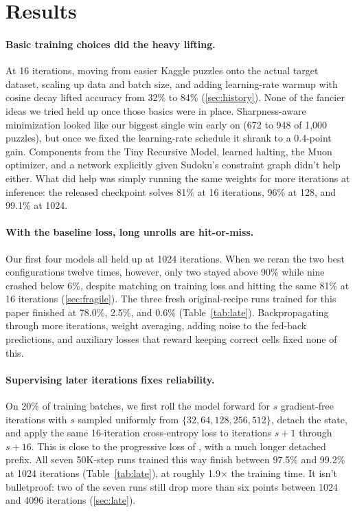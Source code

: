 \documentclass[10pt]{article}
\newcommand{\tabref}[1]{Table~\ref{#1}}
\begin{document}
\section{Results}

\paragraph{Basic training choices did the heavy lifting.} At 16 iterations, moving from easier Kaggle puzzles onto the actual target dataset, scaling up data and batch size, and adding learning-rate warmup with cosine decay lifted accuracy from 32\% to 84\% (\autoref{sec:history}). None of the fancier ideas we tried held up once those basics were in place. Sharpness-aware minimization \citep{foret2021sharpness} looked like our biggest single win early on (672 to 948 of 1,000 puzzles), but once we fixed the learning-rate schedule it shrank to a 0.4-point gain. Components from the Tiny Recursive Model, learned halting, the Muon optimizer, and a network explicitly given Sudoku's constraint graph didn't help either. What did help was simply running the same weights for more iterations at inference: the released checkpoint solves 81\% at 16 iterations, 96\% at 128, and 99.1\% at 1024.

\paragraph{With the baseline loss, long unrolls are hit-or-miss.} Our first four models all held up at 1024 iterations. When we reran the two best configurations twelve times, however, only two stayed above 90\% while nine crashed below 6\%, despite matching on training loss and hitting the same 81\% at 16 iterations (\autoref{sec:fragile}). The three fresh original-recipe runs trained for this paper finished at 78.0\%, 2.5\%, and 0.6\% (\tabref{tab:late}). Backpropagating through more iterations, weight averaging, adding noise to the fed-back predictions, and auxiliary losses that reward keeping correct cells fixed none of this.

\paragraph{Supervising later iterations fixes reliability.} On 20\% of training batches, we first roll the model forward for $s$ gradient-free iterations with $s$ sampled uniformly from $\{32, 64, 128, 256, 512\}$, detach the state, and apply the same 16-iteration cross-entropy loss to iterations $s{+}1$ through $s{+}16$. This is close to the progressive loss of \citet{bansal2022end}, with a much longer detached prefix. All seven 50K-step runs trained this way finish between 97.5\% and 99.2\% at 1024 iterations (\tabref{tab:late}), at roughly 1.9$\times$ the training time. It isn't bulletproof: two of the seven runs still drop more than six points between 1024 and 4096 iterations (\autoref{sec:late}).
\end{document}
